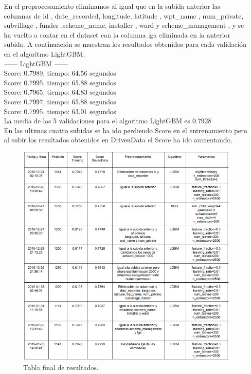 	En el preprocesamiento eliminamos al igual que en la subida anterior las columnas de id , date\_recorded,
	longitude, latitude , wpt\_name , num\_private, subvillage , funder ,scheme\_name, installer , ward y
	scheme\_management , y se ha vuelto a contar en el dataset con la columna lga eliminada en la anterior
	subida. A continuación se muestran los resultados 
	obtenidos para cada validación en el algoritmo LightGBM: \\

	------ LightGBM ------\\
	Score: 0.7989, tiempo:  64.56 segundos\\
	Score: 0.7995, tiempo:  65.88 segundos\\
	Score: 0.7965, tiempo:  64.83 segundos\\
	Score: 0.7997, tiempo:  65.88 segundos\\
	Score: 0.7995, tiempo:  63.01 segundos\\
	
	La media de las 5 validaciones para el algoritmo LightGBM es 0.7928 \\

	En las ultimas cuatro subidas se ha ido perdiendo Score en el entrenamiento pero al subir los 
	resultados obtenidos en DrivenData el Score ha ido aumentando.

	
	\begin{figure}[htb]
		\centering
		\includegraphics[width=1.0\textwidth]{./imagenes/6}
		\caption{Tabla final de resultados.} \label{fig:1}
	\end{figure}
	
